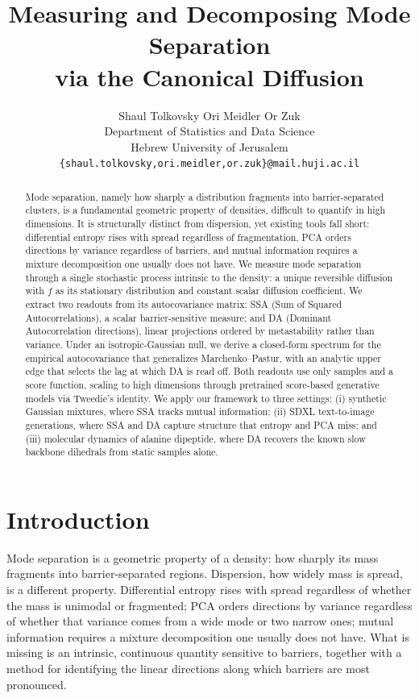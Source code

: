 \documentclass{article}
\title{Measuring and Decomposing Mode Separation\\via the Canonical Diffusion}
\author{
  Shaul Tolkovsky \quad Ori Meidler \quad Or Zuk\\
  Department of Statistics and Data Science\\
  Hebrew University of Jerusalem\\
  \texttt{\{shaul.tolkovsky,ori.meidler,or.zuk\}@mail.huji.ac.il}
}
\begin{document}
\maketitle

\begin{abstract}
Mode separation, namely how sharply a distribution fragments into barrier-separated clusters, is a fundamental geometric property of densities, difficult to quantify in high dimensions. It is structurally distinct from dispersion, yet existing tools fall short: differential entropy rises with spread regardless of fragmentation, PCA orders directions by variance regardless of barriers, and mutual information requires a mixture decomposition one usually does not have. We measure mode separation through a single stochastic process intrinsic to the density: a unique reversible diffusion with $f$ as its stationary distribution and constant scalar diffusion coefficient. We extract two readouts from its autocovariance matrix: SSA (Sum of Squared Autocorrelations), a scalar barrier-sensitive measure; and DA (Dominant Autocorrelation directions), linear projections ordered by metastability rather than variance. Under an isotropic-Gaussian null, we derive a closed-form spectrum for the empirical autocovariance that generalizes Marchenko--Pastur, with an analytic upper edge that selects the lag at which DA is read off. Both readouts use only samples and a score function, scaling to high dimensions through pretrained score-based generative models via Tweedie's identity. We apply our framework to three settings: (i) synthetic Gaussian mixtures, where SSA tracks mutual information; (ii) SDXL text-to-image generations, where SSA and DA capture structure that entropy and PCA miss; and (iii) molecular dynamics of alanine dipeptide, where DA recovers the known slow backbone dihedrals from static samples alone.
\end{abstract}



\section{Introduction}
\label{sec:intro}

Mode separation is a geometric property of a density: how sharply its mass fragments into barrier-separated regions. Dispersion, how widely mass is spread, is a different property. Differential entropy rises with spread regardless of whether the mass is unimodal or fragmented; PCA orders directions by variance regardless of whether that variance comes from a wide mode or two narrow ones; mutual information requires a mixture decomposition one usually does not have. What is missing is an intrinsic, continuous quantity sensitive to barriers, together with a method for identifying the linear directions along which barriers are most pronounced.
\end{document}
